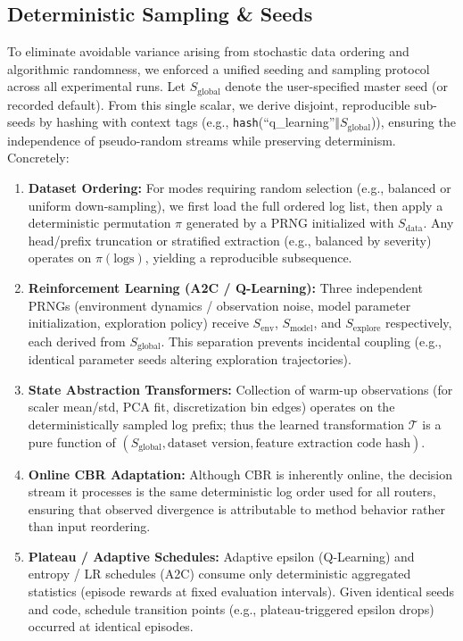 \subsection{Deterministic Sampling \& Seeds}
\label{subsec:deterministic_sampling}
To eliminate avoidable variance arising from stochastic data ordering and algorithmic randomness, we enforced a unified seeding and sampling protocol across all experimental runs. Let $S_{\text{global}}$ denote the user-specified master seed (or recorded default). From this single scalar, we derive disjoint, reproducible sub-seeds by hashing with context tags (e.g., \texttt{hash}(``q\_learning''$\Vert S_{\text{global}}$)), ensuring the independence of pseudo-random streams while preserving determinism. Concretely:
\begin{enumerate}
  \item \textbf{Dataset Ordering:} For modes requiring random selection (e.g., balanced or uniform down-sampling), we first load the full ordered log list, then apply a deterministic permutation $\pi$ generated by a PRNG initialized with $S_{\text{data}}$. Any head/prefix truncation or stratified extraction (e.g., balanced by severity) operates on $\pi(\text{logs})$, yielding a reproducible subsequence.
  \item \textbf{Reinforcement Learning (A2C / Q-Learning):} Three independent PRNGs (environment dynamics / observation noise, model parameter initialization, exploration policy) receive $S_{\text{env}}$, $S_{\text{model}}$, and $S_{\text{explore}}$ respectively, each derived from $S_{\text{global}}$. This separation prevents incidental coupling (e.g., identical parameter seeds altering exploration trajectories).
  \item \textbf{State Abstraction Transformers:} Collection of warm-up observations (for scaler mean/std, PCA fit, discretization bin edges) operates on the deterministically sampled log prefix; thus the learned transformation $\mathcal{T}$ is a pure function of $(S_{\text{global}}, \text{dataset version}, \text{feature extraction code hash})$.
  \item \textbf{Online CBR Adaptation:} Although CBR is inherently online, the decision stream it processes is the same deterministic log order used for all routers, ensuring that observed divergence is attributable to method behavior rather than input reordering.
  \item \textbf{Plateau / Adaptive Schedules:} Adaptive epsilon (Q-Learning) and entropy / LR schedules (A2C) consume only deterministic aggregated statistics (episode rewards at fixed evaluation intervals). Given identical seeds and code, schedule transition points (e.g., plateau-triggered epsilon drops) occurred at identical episodes.
\end{enumerate}

